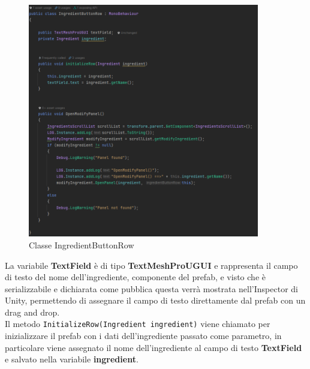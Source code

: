 \begin{figure}[H]
    \centering
    \includegraphics[width=0.9\textwidth,height=\textheight,keepaspectratio]{figures/chapter_1/prefab_CODICE.png}
    \caption{Classe IngredientButtonRow}
    \label{fig:prefabCodice}
\end{figure}

La variabile \textbf{TextField} è di tipo \textbf{TextMeshProUGUI} e rappresenta il campo di testo del nome dell'ingrediente, componente del prefab, e visto che è serializzabile e dichiarata come pubblica questa verrà mostrata nell'Inspector di Unity, permettendo di assegnare il campo di testo direttamente dal prefab con un drag and drop.\\
Il metodo \texttt{InitializeRow(Ingredient ingredient)} viene chiamato per inizializzare il prefab con i dati dell'ingrediente passato come parametro, in particolare viene assegnato il nome dell'ingrediente al campo di testo \textbf{TextField} e salvato nella variabile \textbf{ingredient}.
